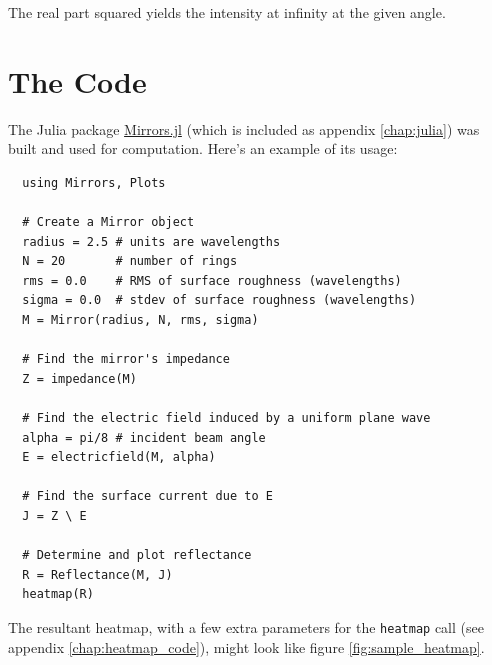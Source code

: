 \documentclass[etd,senior,noacknowledgments]{BYUPhys}
\begin{document}
The real part squared yields the intensity at infinity at the given angle.







\section{The Code}\label{sec:code}

The Julia package \href{https://github.com/mjg0/Mirrors.jl}{Mirrors.jl} (which is included as appendix \ref{chap:julia}) was built and used for computation. Here's an example of its usage:

\begin{verbatim}
  using Mirrors, Plots

  # Create a Mirror object
  radius = 2.5 # units are wavelengths
  N = 20       # number of rings
  rms = 0.0    # RMS of surface roughness (wavelengths)
  sigma = 0.0  # stdev of surface roughness (wavelengths)
  M = Mirror(radius, N, rms, sigma)

  # Find the mirror's impedance
  Z = impedance(M)

  # Find the electric field induced by a uniform plane wave
  alpha = pi/8 # incident beam angle
  E = electricfield(M, alpha)

  # Find the surface current due to E
  J = Z \ E

  # Determine and plot reflectance
  R = Reflectance(M, J)
  heatmap(R)
\end{verbatim}

The resultant heatmap, with a few extra parameters for the \texttt{heatmap} call (see appendix \ref{chap:heatmap_code}), might look like figure \ref{fig:sample_heatmap}.
\end{document}
